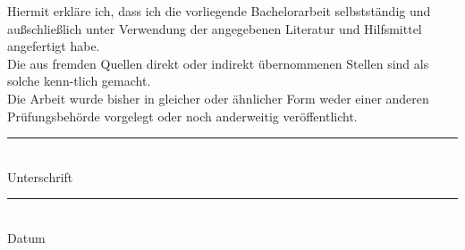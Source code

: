 \documentclass[thesis.tex]{subfiles}
\newcommand{\doublesignature}[3]{%
  \parbox{\textwidth}{
    \parbox{7cm}{
      \rule{6cm}{1pt}\\
       #1 
    }
    \hfill
    \parbox{7cm}{
      \rule{6cm}{1pt}\\
      #2
    }
  }
}
\begin{document}


Hiermit erkläre ich, dass ich die vorliegende Bachelorarbeit selbstständig und außschließlich unter Verwendung der angegebenen Literatur und Hilfsmittel angefertigt habe.\\
Die aus fremden Quellen direkt oder indirekt übernommenen Stellen sind als solche kenn-tlich gemacht.\\

Die Arbeit wurde bisher in gleicher oder ähnlicher Form weder einer anderen Prüfungsbehörde vorgelegt oder noch anderweitig veröffentlicht.
\vspace{100pt}

\doublesignature{Unterschrift}{Datum}

\newpage
\end{document}
